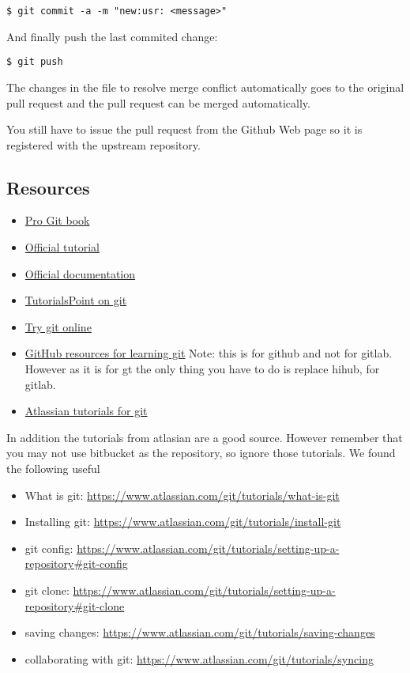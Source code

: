 \begin{verbatim}
$ git commit -a -m "new:usr: <message>"
\end{verbatim}

And finally push the last commited change:

\begin{verbatim}
$ git push
\end{verbatim}

The changes in the file to resolve merge conflict automatically goes to
the original pull request and the pull request can be merged
automatically.

You still have to issue the pull request from the Github Web page so it
is registered with the upstream repository.

\subsection{Resources}

\begin{itemize}
\item
  \href{https://git-scm.com/book/en/v2}{Pro Git book}
\item
  \href{https://git-scm.com/docs/gittutorial}{Official tutorial}
\item
  \href{https://git-scm.com/doc}{Official documentation}
\item
  \href{http://www.tutorialspoint.com/git/}{TutorialsPoint on git}
\item
  \href{https://try.github.io}{Try git online}
\item
  \href{https://help.github.com/articles/good-resources-for-learning-git-and-github/}{GitHub
  resources for learning git} Note: this is for github and not for
  gitlab. However as it is for gt the only thing you have to do is
  replace hihub, for gitlab.
\item
  \href{https://www.atlassian.com/git/tutorials/}{Atlassian tutorials
  for git}
\end{itemize}

In addition the tutorials from atlasian are a good source. However
remember that you may not use bitbucket as the repository, so ignore
those tutorials. We found the following useful

\begin{itemize}
\item
  What is git: \url{https://www.atlassian.com/git/tutorials/what-is-git}
\item
  Installing git:
  \url{https://www.atlassian.com/git/tutorials/install-git}
\item
  git config:
  \url{https://www.atlassian.com/git/tutorials/setting-up-a-repository\#git-config}
\item
  git clone:
  \url{https://www.atlassian.com/git/tutorials/setting-up-a-repository\#git-clone}
\item
  saving changes:
  \url{https://www.atlassian.com/git/tutorials/saving-changes}
\item
  collaborating with git:
  \url{https://www.atlassian.com/git/tutorials/syncing}
\end{itemize}


